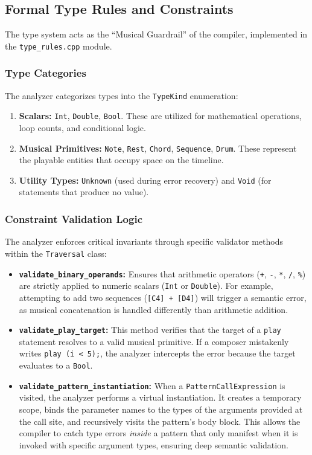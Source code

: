 \subsection{Formal Type Rules and Constraints}\label{subsec:formal-type-rules-and-constraints}

The type system acts as the ``Musical Guardrail'' of the compiler, implemented in the \texttt{type\_rules.cpp} module.

\subsubsection{Type Categories}
The analyzer categorizes types into the \texttt{TypeKind} enumeration:
\begin{enumerate}
  \item \textbf{Scalars:} \texttt{Int}, \texttt{Double}, \texttt{Bool}.
    These are utilized for mathematical operations, loop counts, and conditional logic.
  \item \textbf{Musical Primitives:} \texttt{Note}, \texttt{Rest}, \texttt{Chord}, \texttt{Sequence}, \texttt{Drum}.
    These represent the playable entities that occupy space on the timeline.
  \item \textbf{Utility Types:} \texttt{Unknown} (used during error recovery) and \texttt{Void} (for statements that
    produce no value).
\end{enumerate}

\subsubsection{Constraint Validation Logic}
The analyzer enforces critical invariants through specific validator methods within the \texttt{Traversal} class:

\begin{itemize}
  \item \textbf{\texttt{validate\_binary\_operands}:} Ensures that arithmetic operators (\texttt{+}, \texttt{-},
    \texttt{*}, \texttt{/}, \texttt{\%}) are strictly applied to numeric scalars (\texttt{Int} or \texttt{Double}).
    For example, attempting to add two sequences (\texttt{[C4] + [D4]}) will trigger a semantic error, as musical
    concatenation is handled differently than arithmetic addition.
  \item \textbf{\texttt{validate\_play\_target}:} This method verifies that the target of a \texttt{play}
    statement resolves to a valid musical primitive.
    If a composer mistakenly writes \texttt{play (i < 5);}, the analyzer intercepts the error because the target
    evaluates to a \texttt{Bool}.
  \item \textbf{\texttt{validate\_pattern\_instantiation}:} When a \texttt{PatternCallExpression} is visited,
    the analyzer
    performs a virtual instantiation.
    It creates a temporary scope, binds the parameter names to the types of the arguments provided at the call site, and
    recursively visits the pattern's body block.
    This allows the compiler to catch type errors \textit{inside} a pattern that only manifest when it is invoked with
    specific argument types, ensuring deep semantic validation.
\end{itemize}
